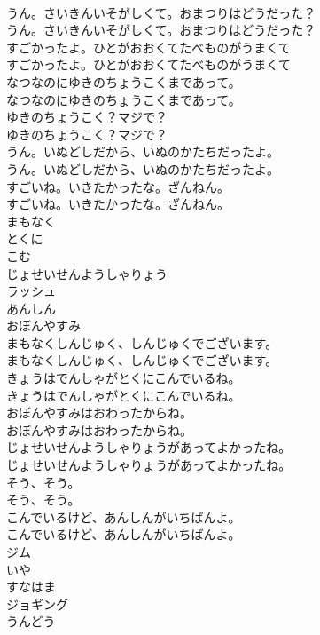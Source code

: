 \documentclass[8pt]{extreport}
\begin{document}
\begin{CJK}{UTF8}{min}
\\	うん。さいきんいそがしくて。おまつりはどうだった？	
\\	うん。さいきんいそがしくて。おまつりはどうだった？ 
\\	すごかったよ。ひとがおおくてたべものがうまくて	
\\	すごかったよ。ひとがおおくてたべものがうまくて 
\\	なつなのにゆきのちょうこくまであって。	
\\	なつなのにゆきのちょうこくまであって。 
\\	ゆきのちょうこく？マジで？	
\\	ゆきのちょうこく？マジで？ 
\\	うん。いぬどしだから、いぬのかたちだったよ。	
\\	うん。いぬどしだから、いぬのかたちだったよ。 
\\	すごいね。いきたかったな。ざんねん。	
\\	すごいね。いきたかったな。ざんねん。 
\\	まもなく
\\	とくに
\\	こむ
\\	じょせいせんようしゃりょう
\\	ラッシュ
\\	あんしん
\\	おぼんやすみ
\\	まもなくしんじゅく、しんじゅくでございます。	
\\	まもなくしんじゅく、しんじゅくでございます。 
\\	きょうはでんしゃがとくにこんでいるね。	
\\	きょうはでんしゃがとくにこんでいるね。 
\\	おぼんやすみはおわったからね。	
\\	おぼんやすみはおわったからね。 
\\	じょせいせんようしゃりょうがあってよかったね。	
\\	じょせいせんようしゃりょうがあってよかったね。 
\\	そう、そう。	
\\	そう、そう。 
\\	こんでいるけど、あんしんがいちばんよ。	
\\	こんでいるけど、あんしんがいちばんよ。 
\\	ジム
\\	いや
\\	すなはま
\\	ジョギング
\\	うんどう

\end{CJK}
\end{document}
